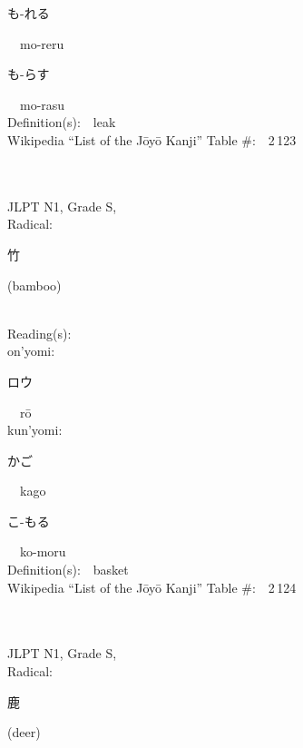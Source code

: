 \begin{multicols}{2}
{\hspace*{2em}}{\begin{CJK}{UTF8}{min} も-れる \end{CJK}}\ \ mo-reru\ \ \\
{\hspace*{2em}}{\begin{CJK}{UTF8}{min} も-らす \end{CJK}}\ \ mo-rasu\ \ \\
Definition(s):\ \ leak \\
Wikipedia ``List of the J\=oy\=o Kanji'' Table \#:\ \ 2\,123 \\
\ \ \\
{\fontsize{34pt}{40pt}  }\ \ \\
{JLPT N1, Grade S, \\Radical:\ \ {\begin{CJK}{UTF8}{min} 竹 \end{CJK}} (bamboo) } \\
Reading(s):\ \ \\
{\hspace*{1em}}on'yomi:\ \ \\
{\hspace*{2em}}{\begin{CJK}{UTF8}{min} ロウ \end{CJK}}\ \ r\=o\ \ \\
{\hspace*{1em}}kun'yomi:\ \ \\
{\hspace*{2em}}{\begin{CJK}{UTF8}{min} かご \end{CJK}}\ \ kago\ \ \\
{\hspace*{2em}}{\begin{CJK}{UTF8}{min} こ-もる \end{CJK}}\ \ ko-moru\ \ \\
Definition(s):\ \ basket \\
Wikipedia ``List of the J\=oy\=o Kanji'' Table \#:\ \ 2\,124 \\
\ \ \\
{\fontsize{34pt}{40pt}  }\ \ \\
{JLPT N1, Grade S, \\Radical:\ \ {\begin{CJK}{UTF8}{min} 鹿 \end{CJK}} (deer) } \\

\end{multicols}
